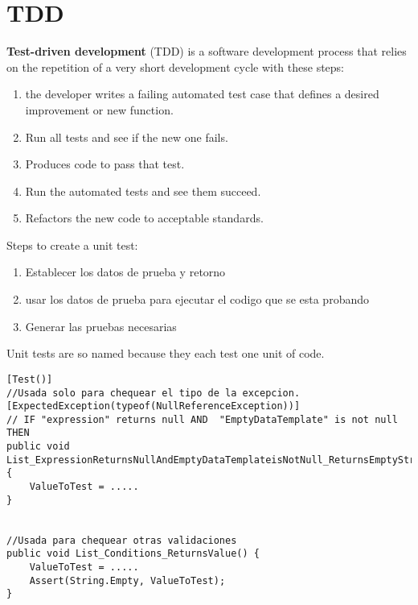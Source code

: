 \section{TDD}

\textbf{Test-driven development} (TDD) is a software development process that relies on the repetition of a very short development cycle with these steps:

\begin{enumerate}
\item the developer writes a failing automated test case that defines a desired improvement or new function.
\item Run all tests and see if the new one fails.
\item Produces code to pass that test.
\item Run the automated tests and see them succeed.
\item Refactors the new code to acceptable standards. 
\end{enumerate}


Steps to create a unit test:


\begin{enumerate}
\item Establecer los datos de prueba y retorno
\item usar los datos de prueba para ejecutar el codigo que se esta probando
\item Generar las pruebas necesarias
\end{enumerate}


Unit tests are so named because they each test one unit of code. 

\begin{center} 
\begin{lstlisting} 
[Test()]
//Usada solo para chequear el tipo de la excepcion.
[ExpectedException(typeof(NullReferenceException))]
// IF "expression" returns null AND  "EmptyDataTemplate" is not null THEN 
public void List_ExpressionReturnsNullAndEmptyDataTemplateisNotNull_ReturnsEmptyString() {
	ValueToTest = .....
}


//Usada para chequear otras validaciones
public void List_Conditions_ReturnsValue() {
	ValueToTest = .....
	Assert(String.Empty, ValueToTest);
}
\end{lstlisting}
\end{center}





